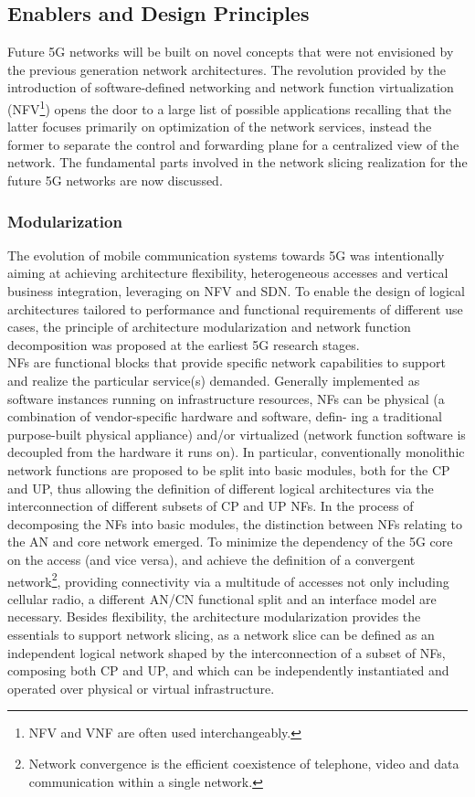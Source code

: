 \documentclass{article}
\begin{document}
\subsection{Enablers and Design Principles}
Future 5G networks will be built on novel concepts that were not envisioned by the previous generation
network architectures. The revolution provided by the introduction of software-defined networking
and network function virtualization (NFV\footnote{NFV and VNF are often used interchangeably.}) opens the door to a
large list of possible applications recalling that the latter focuses primarily on optimization of the network services, instead the former to separate the control and forwarding plane for a centralized view of the network. The fundamental parts involved in the network slicing realization for the future 5G networks are now discussed.

\subsubsection{Modularization}
The evolution of mobile communication systems towards 5G was intentionally aiming at achieving
architecture flexibility, heterogeneous accesses and vertical business integration, leveraging on NFV and SDN. To enable the design of logical architectures tailored to
performance and functional requirements of different use cases, the principle of architecture
modularization and network function decomposition was proposed at the earliest 5G research
stages.\\ 
\gls{NF}s are functional blocks
that provide specific network capabilities to support and realize the particular service(s) demanded. Generally implemented
as software instances running on infrastructure
resources, NFs can be physical (a combination
of vendor-specific hardware and software, defin-
ing a traditional purpose-built physical appliance)
and/or virtualized (network function software is
decoupled from the hardware it runs on). In particular, conventionally monolithic network functions are proposed to be split into basic modules, both for the \gls{CP} and \gls{UP}, thus allowing the definition of different logical architectures via the interconnection of
different subsets of CP and UP NFs.
In the process of decomposing the NFs into basic modules, the distinction between NFs relating to
the \gls{AN} and core network emerged. To minimize the dependency of the 5G
core on the access (and vice versa), and achieve the definition of a convergent network\footnote{Network convergence is the efficient coexistence of telephone, video and data communication within a single network.}, providing
connectivity via a multitude of accesses not only including cellular radio, a different AN/CN functional split and an interface model are necessary.
Besides flexibility, the architecture modularization provides the essentials to support network
­slicing, as a network slice can be defined as an independent logical network shaped by the interconnection of a subset of NFs, composing both CP and UP, and which can be independently instantiated
and operated over physical or virtual infrastructure.
\end{document}
